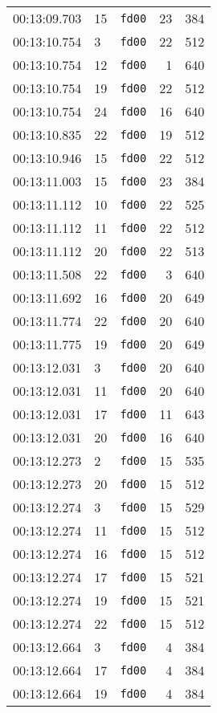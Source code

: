 \documentclass{article}
\begin{document}
\begin{longtable}{lllrr}
00:13:09.703 & 15 & \texttt{fd00} & 23 & 384 \\
00:13:10.754 & 3 & \texttt{fd00} & 22 & 512 \\
00:13:10.754 & 12 & \texttt{fd00} & 1 & 640 \\
00:13:10.754 & 19 & \texttt{fd00} & 22 & 512 \\
00:13:10.754 & 24 & \texttt{fd00} & 16 & 640 \\
00:13:10.835 & 22 & \texttt{fd00} & 19 & 512 \\
00:13:10.946 & 15 & \texttt{fd00} & 22 & 512 \\
00:13:11.003 & 15 & \texttt{fd00} & 23 & 384 \\
00:13:11.112 & 10 & \texttt{fd00} & 22 & 525 \\
00:13:11.112 & 11 & \texttt{fd00} & 22 & 512 \\
00:13:11.112 & 20 & \texttt{fd00} & 22 & 513 \\
00:13:11.508 & 22 & \texttt{fd00} & 3 & 640 \\
00:13:11.692 & 16 & \texttt{fd00} & 20 & 649 \\
00:13:11.774 & 22 & \texttt{fd00} & 20 & 640 \\
00:13:11.775 & 19 & \texttt{fd00} & 20 & 649 \\
00:13:12.031 & 3 & \texttt{fd00} & 20 & 640 \\
00:13:12.031 & 11 & \texttt{fd00} & 20 & 640 \\
00:13:12.031 & 17 & \texttt{fd00} & 11 & 643 \\
00:13:12.031 & 20 & \texttt{fd00} & 16 & 640 \\
00:13:12.273 & 2 & \texttt{fd00} & 15 & 535 \\
00:13:12.273 & 20 & \texttt{fd00} & 15 & 512 \\
00:13:12.274 & 3 & \texttt{fd00} & 15 & 529 \\
00:13:12.274 & 11 & \texttt{fd00} & 15 & 512 \\
00:13:12.274 & 16 & \texttt{fd00} & 15 & 512 \\
00:13:12.274 & 17 & \texttt{fd00} & 15 & 521 \\
00:13:12.274 & 19 & \texttt{fd00} & 15 & 521 \\
00:13:12.274 & 22 & \texttt{fd00} & 15 & 512 \\
00:13:12.664 & 3 & \texttt{fd00} & 4 & 384 \\
00:13:12.664 & 17 & \texttt{fd00} & 4 & 384 \\
00:13:12.664 & 19 & \texttt{fd00} & 4 & 384 \\

\end{longtable}
\end{document}
